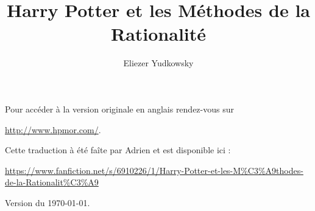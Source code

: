 \documentclass[12pt, a4paper]{book}
\title{Harry Potter et les Méthodes de la Rationalité}
\author{Eliezer Yudkowsky}
\begin{document}


Pour accéder à la version originale en anglais rendez-vous sur

\url{http://www.hpmor.com/}.

Cette traduction à été faîte par Adrien et est disponible ici :

\url{https://www.fanfiction.net/s/6910226/1/Harry-Potter-et-les-M%C3%A9thodes-de-la-Rationalit%C3%A9} 

Version du \today.

\tableofcontents




\end{document}

